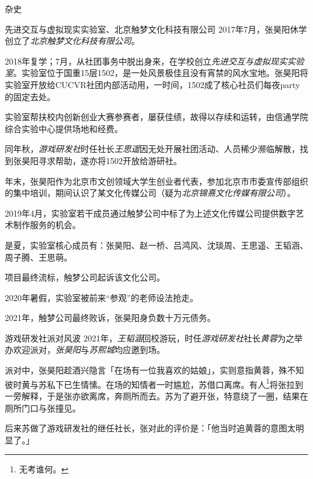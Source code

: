 \documentclass{paper}
\newcommand{\name}[1]{{\em #1}}
\begin{document}
\newpage
\begin{section}{杂史}
	\begin{subsection}{先进交互与虚拟现实实验室、北京触梦文化科技有限公司}
		2017年7月，张昊阳休学创立了\name{北京触梦文化科技有限公司}。

		2018年复学；7月，从社团事务中脱出身来，在学校创立\name{先进交互与虚拟现实实验室}。实验室位于国重15层1502，是一处风景极佳且没有宵禁的风水宝地。张昊阳将实验室开放给CUCVR社团内部活动用，一时间，1502成了核心社员们每夜party的固定去处。

		实验室帮扶校内创新创业大赛参赛者，屡获佳绩，故得以存续和运转，由信通学院综合实验中心提供场地和经费。

		同年秋，\name{游戏研发社}时任社长\name{王思遥}因无处开展社团活动、人员稀少濒临解散，找到张昊阳寻求帮助，遂亦将1502开放给游研社。

		年末，张昊阳作为北京市文创领域大学生创业者代表，参加北京市市委宣传部组织的集中培训，期间认识了某文化传媒公司（疑为\name{北京锦熹文化传媒有限公司}）。

		2019年4月，实验室若干成员通过触梦公司中标了为上述文化传媒公司提供数字艺术制作服务的机会。

		是夏，实验室核心成员有：张昊阳、赵一桥、吕鸿风、沈琰周、王思遥、王韬涵、周子腾、王思萌。

		项目最终流标，触梦公司起诉该文化公司。

		2020年暑假，实验室被前来“参观”的老师设法抢走。

		2021年，触梦公司最终败诉，张昊阳身负数十万元债务。
	\end{subsection}
	\begin{subsection}{游戏研发社派对风波}
		2021年，\name{王韬涵}回校游玩，时任\name{游戏研发社}社长\name{黄蓉}为之举办欢迎派对，\name{张昊阳}与\name{苏熙城}均应邀到场。

		派对中，张昊阳趁酒兴隐言「在场有一位我喜欢的姑娘」，实则意指黄蓉，殊不知彼时黄与苏私下已生情愫。在场的知情者一时尴尬，苏借口离席。有人\footnote{无考谁何。}将张拉到一旁解释，于是张亦欲离席，奔厕所而去。苏为了避开张，特意绕了一圈，结果在厕所门口与张撞见。

		后来苏做了游戏研发社的继任社长，张对此的评价是：「他当时追黄蓉的意图太明显了。」
	\end{subsection}
\end{section}
\end{document}
